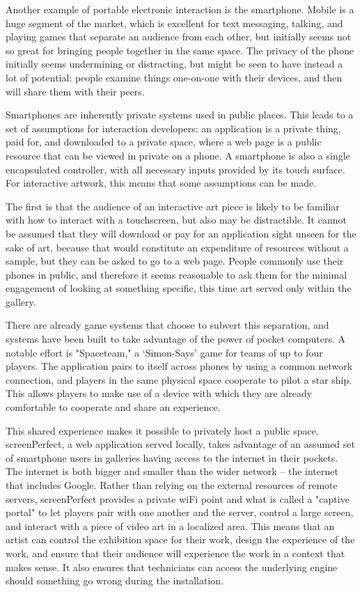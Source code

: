 Another example of portable electronic interaction is the smartphone. Mobile is a huge segment of the market, which is excellent for text messaging, talking, and playing games that separate an audience from each other, but initially seems not so great for bringing people together in the same space. The privacy of the phone initially seems undermining or distracting, but might be seen to have instead a lot of potential: people examine things one-on-one with their devices, and then will share them with their peers.

Smartphones are inherently private systems used in public places. This leads to a set of assumptions for interaction developers: an application is a private thing, paid for, and downloaded to a private space, where a web page is a public resource that can be viewed in private on a phone. A smartphone is also a single encapsulated controller, with all necessary inputs provided by its touch surface. For interactive artwork, this means that some assumptions can be made.

The first is that the audience of an interactive art piece is likely to be familiar with how to interact with a touchscreen, but also may be distractible. It cannot be assumed that they will download or pay for an application sight unseen for the sake of art, because that would constitute an expenditure of resources without a sample, but they can be asked to go to a web page. People commonly use their phones in public, and therefore it seems reasonable to ask them for the minimal engagement of looking at something specific, this time art served only within the gallery. 

There are already game systems that choose to subvert this separation, and systems have been built to take advantage of the power of pocket computers. A notable effort is "Spaceteam," \parencite{spaceteam} a ‘Simon-Says' game for teams of up to four players. The application pairs to itself across phones by using a common network connection, and players in the same physical space cooperate to pilot a star ship. This allows players to make use of a device with which they are already comfortable to cooperate and share an experience.

This shared experience makes it possible to privately host a public space. screenPerfect, a web application served locally, takes advantage of an assumed set of smartphone users in galleries having access to the internet in their pockets. The internet is both bigger and smaller than the wider network – the internet that includes Google. Rather than relying on the external resources of remote servers, screenPerfect provides a private wiFi point and what is called a "captive portal" to let players pair with one another and the server, control a large screen, and interact with a piece of video art in a localized area. This means that an artist can control the exhibition space for their work, design the experience of the work, and ensure that their audience will experience the work in a context that makes sense. It also ensures that technicians can access the underlying engine should something go wrong during the installation.

